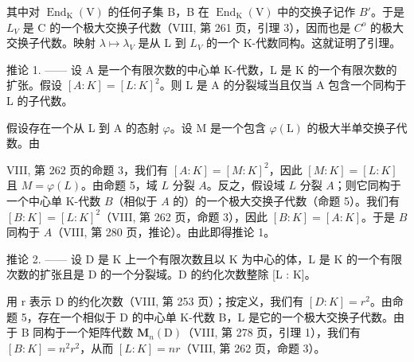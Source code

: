 其中对 \(\operatorname{End}_{\mathrm{K}}(\mathrm{V})\) 的任何子集 B，B 在 \(\operatorname{End}_{\mathrm{K}}(\mathrm{V})\) 中的交换子记作 \(B'\)。于是 \(L_{V}\) 是 C 的一个极大交换子代数（VIII, 第 261 页，引理 3），因而也是 \(C^{o}\) 的极大交换子代数。映射 \(\lambda \mapsto \lambda_{V}\) 是从 L 到 \(L_{V}\) 的一个 K-代数同构。这就证明了引理。

推论 1. —— 设 A 是一个有限次数的中心单 K-代数，L 是 K 的一个有限次数的扩张。假设 \([A:K]=[L:K]^{2}\)。则 L 是 A 的分裂域当且仅当 A 包含一个同构于 L 的子代数。

假设存在一个从 L 到 A 的态射 \(\varphi\)。设 M 是一个包含 \(\varphi(\mathrm{L})\) 的极大半单交换子代数。由

VIII, 第 262 页的命题 3，我们有 \([A:K] = [M:K]^2\)，因此 \([M:K] = [L:K]\) 且 \(M = \varphi(L)\)。由命题 5，域 \(L\) 分裂 \(A\)。反之，假设域 \(L\) 分裂 \(A\)；则它同构于一个中心单 K-代数 \(B\)（相似于 \(A\) 的）的一个极大交换子代数（命题 5）。我们有 \([B:K] = [L:K]^2\)（VIII, 第 262 页，命题 3），因此 \([B:K] = [A:K]\)。于是 \(B\) 同构于 \(A\)（VIII, 第 280 页，推论）。由此即得推论 1。

推论 2. —— 设 D 是 K 上一个有限次数且以 K 为中心的体，L 是 K 的一个有限次数的扩张且是 D 的一个分裂域。D 的约化次数整除 {[}L : K{]}。

用 r 表示 D 的约化次数（VIII, 第 253 页）；按定义，我们有 \([D:K]=r^{2}\)。由命题 5，存在一个相似于 D 的中心单 K-代数 B，L 是它的一个极大交换子代数。由于 B 同构于一个矩阵代数 \(\mathbf{M}_{n}(\mathrm{D})\)（VIII, 第 278 页，引理 1），我们有 \([B:K]=n^{2}r^{2}\)，从而 \([L:K]=nr\)（VIII, 第 262 页，命题 3）。

